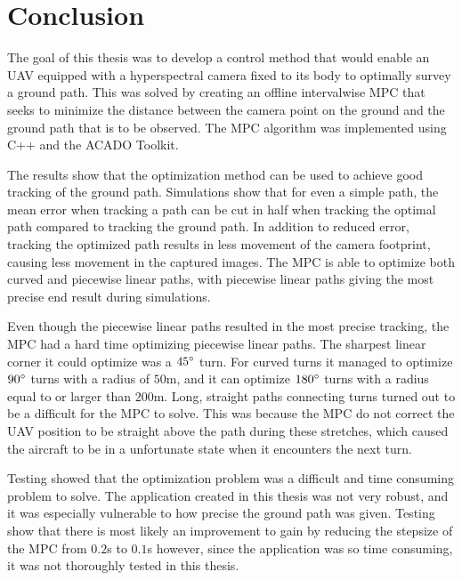 \chapter{Conclusion}

The goal of this thesis was to develop a control method that would enable an UAV equipped with a hyperspectral camera fixed to its body to optimally survey a ground path. This was solved by creating an offline intervalwise MPC that seeks to minimize the distance between the camera point on the ground and the ground path that is to be observed. The MPC algorithm was implemented using C++ and the ACADO Toolkit.

The results show that the optimization method can be used to achieve good tracking of the ground path. Simulations show that for even a simple path, the mean error when tracking a path can be cut in half when tracking the optimal path compared to tracking the ground path. In addition to reduced error, tracking the optimized path results in less movement of the camera footprint, causing less movement in the captured images. The MPC is able to optimize both curved and piecewise linear paths, with piecewise linear paths giving the most precise end result during simulations.

Even though the piecewise linear paths resulted in the most precise tracking, the MPC had a hard time optimizing piecewise linear paths. The sharpest linear corner it could optimize was a $45\degree$ turn. For curved turns it managed to optimize $90\degree$ turns with a radius of $50$m, and it can optimize $180\degree$ turns with a radius equal to or larger than $200$m. Long, straight paths connecting turns turned out to be a difficult for the MPC to solve. This was because the MPC do not correct the UAV position to be straight above the path during these stretches, which caused the aircraft to be in a unfortunate state when it encounters the next turn.

Testing showed that the optimization problem was a difficult and time consuming problem to solve. The application created in this thesis was not very robust, and it was especially vulnerable to how precise the ground path was given. Testing show that there is most likely an improvement to gain by reducing the stepsize of the MPC from $0.2$s to $0.1$s however, since the application was so time consuming, it was not thoroughly tested in this thesis.


